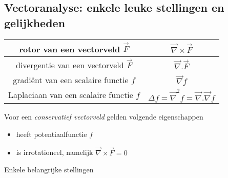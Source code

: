 \documentclass[10pt,a4paper]{article}
\begin{document}
\newpage
\subsection{Vectoranalyse: enkele leuke stellingen en gelijkheden}


\begin{center}
	\centering
	{\tabulinesep=1.5mm
		\begin{tabu}{|c|c|} 
			\hline
rotor van een vectorveld $\vec{F}$ & $\vec{\nabla} \times \vec{F}$ \\ \hline

divergentie van een vectorveld $\vec{F}$ & $\vec{\nabla}.\vec{F}$ \\ \hline \hline

gradi\"ent van een scalaire functie $f$ & $\vec{\nabla}f$ \\ \hline

Laplaciaan van een scalaire functie $f$ & $\Delta f = \vec{\nabla}^2 f = \vec{\nabla}.\vec{\nabla}f$ \\ \hline
	\end{tabu}}
\end{center}


Voor een \textit{conservatief vectorveld} gelden volgende eigenschappen
\begin{itemize}
	\item heeft potentiaalfunctie $f$
	\item is irrotationeel, namelijk $\vec{\nabla} \times \vec{F} = 0$
\end{itemize}

Enkele belangrijke stellingen
\end{document}
